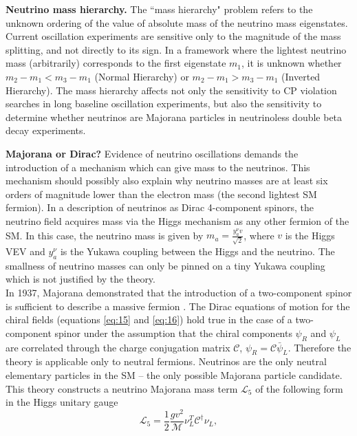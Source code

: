 \textbf{Neutrino mass hierarchy.} The  ``mass hierarchy" problem refers to the unknown ordering of the value of absolute mass of the neutrino mass eigenstates. Current oscillation experiments are sensitive only to the magnitude of the mass splitting, and not directly to its sign. In a framework where the lightest neutrino mass (arbitrarily) corresponds to the first eigenstate $m_1$, it is unknown whether $m_2 - m_1 < m_3 - m_1$ (Normal Hierarchy) or $m_2 - m_1 > m_3 - m_1$ (Inverted Hierarchy). The mass hierarchy affects not only the sensitivity to CP violation searches in long baseline oscillation experiments, but also the sensitivity to determine whether neutrinos are Majorana particles in neutrinoless double beta decay experiments.

\textbf{Majorana or Dirac?}
Evidence of neutrino oscillations demands the introduction of a mechanism which can give mass to the neutrinos.  This mechanism should possibly also explain why neutrino masses are at least six orders of magnitude lower than the electron mass (the second lightest SM fermion).
In a description of neutrinos as Dirac 4-component spinors, the neutrino field acquires mass  via the Higgs mechanism as any other fermion of the SM. In this case, the neutrino mass is given by 
$m_a = \frac{y^\nu_a v}{\sqrt2}$, %
where $v$ is the Higgs VEV and   $y^\nu_a$ is the Yukawa coupling between the Higgs and the neutrino. The smallness of neutrino masses can only be pinned on a tiny Yukawa coupling which is not justified by the theory.\\
In 1937, Majorana demonstrated that the introduction of a two-component spinor is sufficient to describe a massive fermion \cite{Majorana1937}. The Dirac equations of motion for the chiral fields (equations \ref{eq:15} and \ref{eq:16}) hold true in the case of a two-component spinor under the assumption that the chiral components $\psi_R$ and $\psi_L$ are correlated through the charge conjugation matrix $\mathcal{C}$, $\psi_R = \mathcal{C}\bar\psi_L$. Therefore the theory is applicable only to neutral fermions.  Neutrinos are the only neutral elementary particles in the SM -- the only possible Majorana particle candidate. This theory constructs a  neutrino Majorana mass term $\mathcal{L}_5 $ of the following form in the Higgs unitary gauge
\begin{equation}
\mathcal{L}_5 = \frac{1}{2}\frac{gv^2}{\mathcal{M}}\nu^T_L\mathcal{C^\dagger}\nu_L,
\label{eq:majoMass}
 \end{equation}
